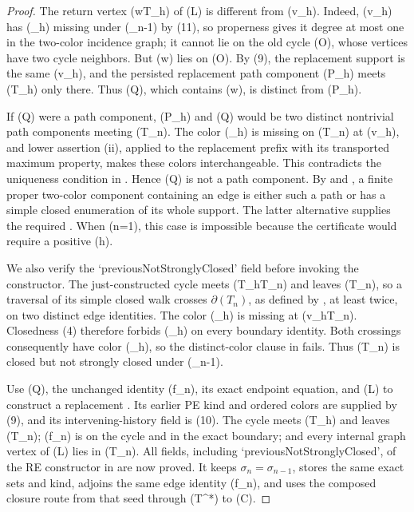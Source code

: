 \begin{proof}
The return vertex (w\in T_h) of (L) is different from (v_h).  Indeed,
(v_h) has (\delta_h) missing under (\varphi_{n-1}) by (11), so properness
gives it degree at most one in the two-color incidence graph; it cannot
lie on the old cycle (O), whose vertices have two cycle neighbors.  But
(w) lies on (O).  By (9), the replacement support is the same (v_h), and
the persisted replacement path component (P_h) meets (T_h) only there.
Thus (Q), which contains (w), is distinct from (P_h).

If (Q) were a path component, (P_h) and (Q) would be two distinct
nontrivial path components meeting (T_n).  The color (\delta_h) is missing
on (T_n) at (v_h), and lower assertion (ii), applied to the replacement
prefix with its transported maximum property, makes these colors
interchangeable.  This contradicts the uniqueness condition in
.  Hence (Q) is not a path component.
By  and
, a finite proper two-color
component containing an edge is either such a path or has a simple closed
enumeration of its whole support.  The latter alternative supplies the
required .  When (n=1), this case is impossible
because the certificate would require a positive (h).

We also verify the `previousNotStronglyClosed' field before invoking the
constructor.  The just-constructed cycle meets (T_h\subseteq T_n) and
leaves (T_n), so a traversal of its simple closed walk crosses
\(\partial(T_n)\), as defined by , at least twice,
on two distinct edge identities.  The
color (\delta_h) is missing at (v_h\in T_n).  Closedness (4) therefore
forbids (\delta_h) on every boundary identity.  Both crossings consequently
have color (\gamma_h), so the distinct-color clause in
 fails.  Thus (T_n) is closed but
not strongly closed under (\sigma_{n-1}).

Use (Q), the unchanged identity (f_n), its exact endpoint equation, and
(L) to construct a replacement
.  Its earlier PE kind and ordered
colors are supplied by (9), and its intervening-history field is (10).
The cycle meets (T_h) and leaves (T_n); (f_n) is on the cycle and in the
exact boundary; and every internal graph vertex of (L) lies in (T_n).
All fields, including `previousNotStronglyClosed', of the RE constructor
in  are now proved.  It keeps
\(\sigma_n=\sigma_{n-1}\), stores the same exact sets and kind, adjoins
the same edge identity (f_n), and uses the composed closure route from
that seed through (T^*) to (C).


\end{proof}
